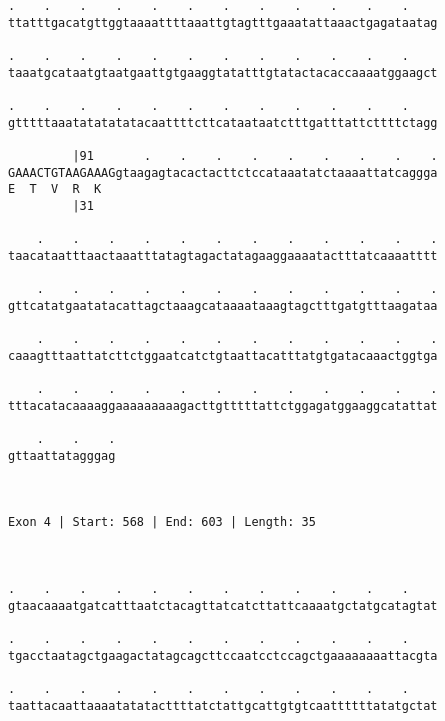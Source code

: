 \documentclass{article}
\begin{document}
\begin{Verbatim}
.    .    .    .    .    .    .    .    .    .    .    .    
ttatttgacatgttggtaaaattttaaattgtagtttgaaatattaaactgagataatag
                                                            
.    .    .    .    .    .    .    .    .    .    .    .    
taaatgcataatgtaatgaattgtgaaggtatatttgtatactacaccaaaatggaagct
                                                            
.    .    .    .    .    .    .    .    .    .    .    .    
gtttttaaatatatatatacaattttcttcataataatctttgatttattcttttctagg
                                                            
         |91       .    .    .    .    .    .    .    .    .
GAAACTGTAAGAAAGgtaagagtacactacttctccataaatatctaaaattatcaggga
E  T  V  R  K                                               
         |31                                                
  
    .    .    .    .    .    .    .    .    .    .    .    .
taacataatttaactaaatttatagtagactatagaaggaaaatactttatcaaaatttt
                                                            
    .    .    .    .    .    .    .    .    .    .    .    .
gttcatatgaatatacattagctaaagcataaaataaagtagctttgatgtttaagataa
                                                            
    .    .    .    .    .    .    .    .    .    .    .    .
caaagtttaattatcttctggaatcatctgtaattacatttatgtgatacaaactggtga
                                                            
    .    .    .    .    .    .    .    .    .    .    .    .
tttacatacaaaaggaaaaaaaaagacttgtttttattctggagatggaaggcatattat
                                                            
    .    .    .
gttaattatagggag
               
               
 
Exon 4 | Start: 568 | End: 603 | Length: 35



.    .    .    .    .    .    .    .    .    .    .    .    
gtaacaaaatgatcatttaatctacagttatcatcttattcaaaatgctatgcatagtat
                                                            
.    .    .    .    .    .    .    .    .    .    .    .    
tgacctaatagctgaagactatagcagcttccaatcctccagctgaaaaaaaattacgta
                                                            
.    .    .    .    .    .    .    .    .    .    .    .    
taattacaattaaaatatatacttttatctattgcattgtgtcaattttttatatgctat
                                                            

\end{Verbatim}
\end{document}
